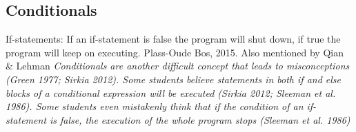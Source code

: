 \subsection{Conditionals}

If-statements: If an if-statement is false the program will shut down, if true the program will keep on executing. Plass-Oude Bos, 2015. Also mentioned by Qian \& Lehman \emph{Conditionals are another difficult concept that leads to misconceptions (Green 1977; Sirkia 2012). Some students believe statements in both if and else blocks of a conditional expression will be executed (Sirkia 2012; Sleeman et al. 1986). Some students even mistakenly think that if the condition of an if-statement is false, the execution of the whole program stops (Sleeman et al. 1986)}

